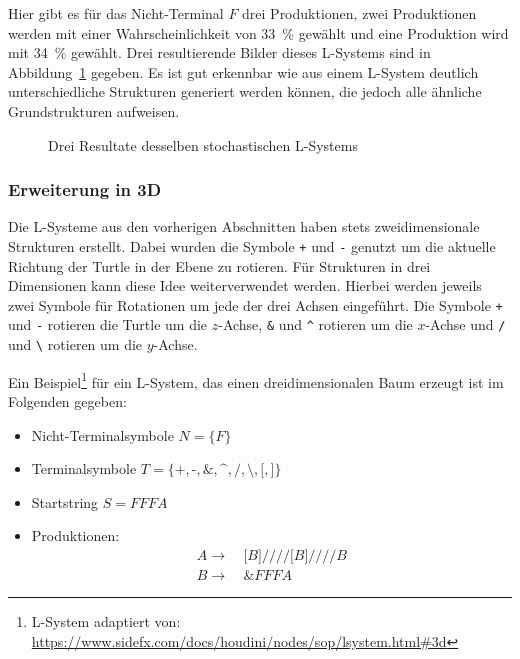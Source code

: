 Hier gibt es für das Nicht-Terminal $F$ drei Produktionen, zwei Produktionen werden mit einer Wahrscheinlichkeit von \SI{33}{\percent} gewählt und eine Produktion wird mit \SI{34}{\percent} gewählt.
Drei resultierende Bilder dieses L-Systems sind in Abbildung~\ref{fig:Stochastic} gegeben.
Es ist gut erkennbar wie aus einem L-System deutlich unterschiedliche Strukturen generiert werden können, die jedoch alle ähnliche Grundstrukturen aufweisen.
\begin{figure}[ht]
    \begin{subfigure}[t]{.25\textwidth}
        \centering
        
    \end{subfigure}
    \hfill
    \begin{subfigure}[t]{.25\textwidth}
        \centering
        
    \end{subfigure}
    \hfill
    \begin{subfigure}[t]{.25\textwidth}
        \centering
        
    \end{subfigure}
    \caption[Stochastisches L-System Ableitungen]{Drei Resultate desselben stochastischen L-Systems}\label{fig:Stochastic}
\end{figure}


\subsubsection{Erweiterung in 3D}\label{subsub: L-System 3D}
Die L-Systeme aus den vorherigen Abschnitten haben stets zweidimensionale Strukturen erstellt.
Dabei wurden die Symbole \texttt{+} und \texttt{-} genutzt um die aktuelle Richtung der Turtle in der Ebene zu rotieren.
Für Strukturen in drei Dimensionen kann diese Idee weiterverwendet werden.
Hierbei werden jeweils zwei Symbole für Rotationen um jede der drei Achsen eingeführt.
Die Symbole \texttt{+} und \texttt{-} rotieren die Turtle um die $z$-Achse, \texttt{\&} und \texttt{\textasciicircum} rotieren um die $x$-Achse und \texttt{/} und \texttt{\textbackslash} rotieren um die $y$-Achse.

Ein Beispiel\footnote{L-System adaptiert von: \url{https://www.sidefx.com/docs/houdini/nodes/sop/lsystem.html\#3d}} für ein L-System, das einen dreidimensionalen Baum erzeugt ist im Folgenden gegeben:
\begin{itemize}
    \item Nicht-Terminalsymbole $N=\{F\}$
    \item Terminalsymbole $T=\{\texttt{+},\texttt{-},\texttt{\&},\texttt{\textasciicircum},\texttt{/},\texttt{\textbackslash},\texttt{[},\texttt{]}\}$
    \item Startstring $S=FFFA$
    \item Produktionen:
          \begin{align*}
              A\rightarrow & ~\texttt{[}B\texttt{]////[}B\texttt{]////}B \\
              B\rightarrow & ~\texttt{\&}FFFA
          \end{align*}
\end{itemize}

